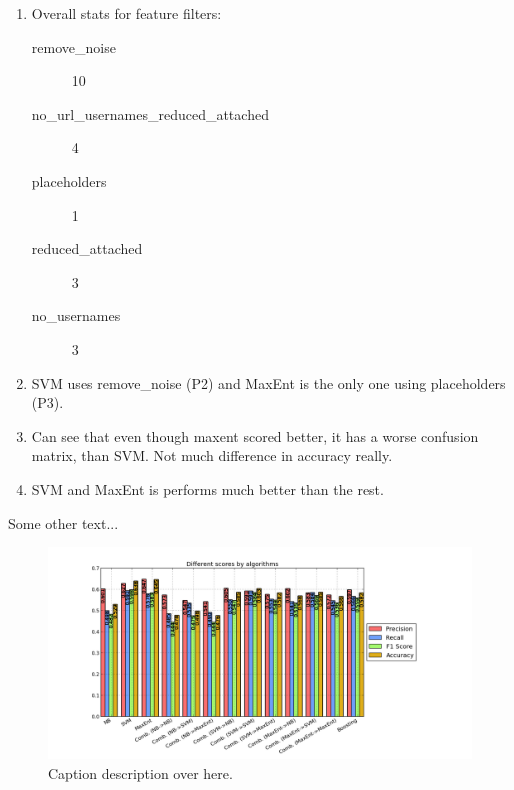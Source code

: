 \begin{enumerate}
\item Overall stats for feature filters:
	\begin{description}
		\item[remove\_noise] 10
		\item[no\_url\_usernames\_reduced\_attached] 4
		\item[placeholders] 1
		\item[reduced\_attached] 3
		\item[no\_usernames] 3
	\end{description}

\item SVM uses remove\_noise (P2) and MaxEnt is the only one using placeholders (P3). 
 
\item Can see that even though maxent scored better, it has a worse confusion matrix, than SVM. Not much difference in accuracy really. 

\item SVM and MaxEnt is performs much better than the rest. 
\end{enumerate}

Some other text... 

\begin{figure}
 \begin{center}
     \includegraphics[width=\linewidth]{../img/plots/grid/full.png}
 \end{center}
 \caption[Results overview across models]{Caption description over here.}
 \label{fig:results_full}
\end{figure}



